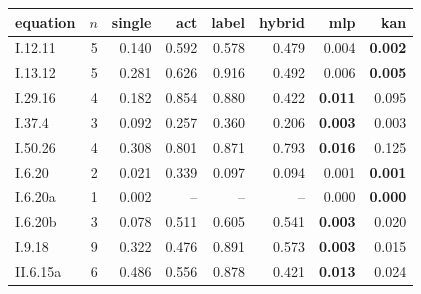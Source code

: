 \begin{tabular}{@{}lrrrrrrr@{}}\toprule
equation & $n$ & single & act & label & hybrid & mlp & kan\\\midrule
I.12.11 & 5 & 0.140 & 0.592 & 0.578 & 0.479 & 0.004 & \textbf{0.002}\\
I.13.12 & 5 & 0.281 & 0.626 & 0.916 & 0.492 & 0.006 & \textbf{0.005}\\
I.29.16 & 4 & 0.182 & 0.854 & 0.880 & 0.422 & \textbf{0.011} & 0.095\\
I.37.4 & 3 & 0.092 & 0.257 & 0.360 & 0.206 & \textbf{0.003} & 0.003\\
I.50.26 & 4 & 0.308 & 0.801 & 0.871 & 0.793 & \textbf{0.016} & 0.125\\
I.6.20 & 2 & 0.021 & 0.339 & 0.097 & 0.094 & 0.001 & \textbf{0.001}\\
I.6.20a & 1 & 0.002 & -- & -- & -- & 0.000 & \textbf{0.000}\\
I.6.20b & 3 & 0.078 & 0.511 & 0.605 & 0.541 & \textbf{0.003} & 0.020\\
I.9.18 & 9 & 0.322 & 0.476 & 0.891 & 0.573 & \textbf{0.003} & 0.015\\
II.6.15a & 6 & 0.486 & 0.556 & 0.878 & 0.421 & \textbf{0.013} & 0.024\\
\bottomrule\end{tabular}